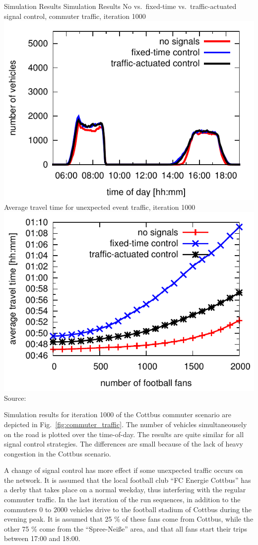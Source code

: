 \createfigure%
{Simulation Results}%
{Simulation Results}%
{\label{fig:results_histogram}}
{%
  \createsubfigure%
  {No vs.~fixed-time vs.~traffic-actuated signal control, commuter traffic, iteration 1000}%
	{\includegraphics[width=0.48\linewidth]{extending/figures/signalslanes/leg_histogram_1292_1293_1291_it_1000.pdf}}
  {\label{fig:commuter_traffic}}%
  \createsubfigure%
	{Average travel time for unexpected event traffic, iteration 1000}
	{\includegraphics[width=0.48\linewidth]{extending/figures/signalslanes/average_travel_time_1220_1222.pdf}}
	{\label{fig:unexpected_event}}
}%
{Source:~\citet{Grether2014PhD}}

Simulation results for iteration 1000 of the Cottbus commuter scenario are depicted in
Fig.~\ref{fig:commuter_traffic}. 
The number of vehicles simultaneousely on the road is plotted over the time-of-day. 
The results are quite similar for all signal control strategies. 
The differences are small because of the lack of heavy congestion in the Cottbus scenario. 

A change of signal control has more effect if some unexpected traffic occurs on the network. 
It is assumed that the local football club ``FC Energie Cottbus'' has a derby that takes place on a normal weekday, thus interfering with the regular commuter traffic. 
In the last iteration of the run sequences, in addition to the commuters $0$ to $2000$ vehicles drive to the football stadium of Cottbus during the evening peak. 
It is assumed that 25 \% of these fans come from Cottbus,
while the other 75 \% come from the ``Spree-Nei{\ss}e'' area, and that all fans start their trips between 17:00 and 18:00. 

